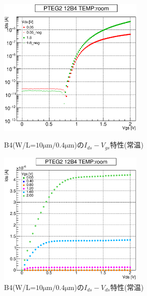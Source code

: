 				\begin{figure}[htbp]
					\begin{minipage}{0.5\hsize}
						\begin{center}
							\includegraphics[width=70mm]{./Chapter/Appendix/Picture/NBT/B4/PTEG2_12_B4_IdVg_room.eps}
						\end{center}
						\caption{B4(W/L=$10\mathrm{\mu m}/0.4\mathrm{\mu m}$)の$I_{ds}-V_{gs}$特性(常温)}
						\label{fig:B4_IdVg_room}
					\end{minipage}
					\begin{minipage}{0.5\hsize}
						\begin{center}
							\includegraphics[width=70mm]{./Chapter/Appendix/Picture/NBT/B4/PTEG2_12_B4_IdVd_room.eps}
						\end{center}
						\caption{B4(W/L=$10\mathrm{\mu m}/0.4\mathrm{\mu m}$)の$I_{ds}-V_{ds}$特性(常温)}
						\label{fig:B4_IdVd_room}
					\end{minipage}
				\end{figure}
				\clearpage
